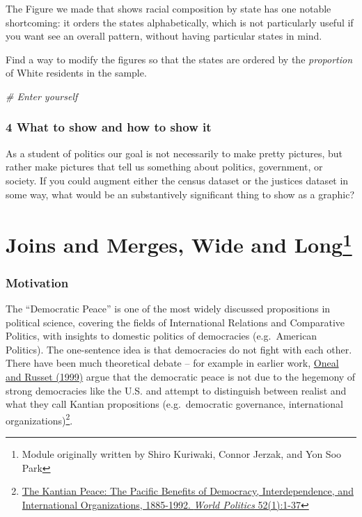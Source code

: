 \documentclass[
]{book}
\newenvironment{Shaded}{\begin{snugshade}}{\end{snugshade}}
\newcommand{\CommentTok}[1]{\textcolor[rgb]{0.56,0.35,0.01}{\textit{#1}}}
\theoremstyle{definition}
\theoremstyle{definition}
\theoremstyle{definition}
\theoremstyle{remark}
\begin{document}
The Figure we made that shows racial composition by state has one notable shortcoming: it orders the states alphabetically, which is not particularly useful if you want see an overall pattern, without having particular states in mind.

Find a way to modify the figures so that the states are ordered by the \emph{proportion} of White residents in the sample.

\begin{Shaded}
\begin{Highlighting}[]
\CommentTok{\# Enter yourself}
\end{Highlighting}
\end{Shaded}

\hypertarget{what-to-show-and-how-to-show-it}{%
\subsection*{4 What to show and how to show it}\label{what-to-show-and-how-to-show-it}}

As a student of politics our goal is not necessarily to make pretty pictures, but rather make pictures that tell us something about politics, government, or society. If you could augment either the census dataset or the justices dataset in some way, what would be an substantively significant thing to show as a graphic?

\hypertarget{dempeace}{%
\chapter[Joins and Merges, Wide and Long]{\texorpdfstring{Joins and Merges, Wide and Long\footnote{Module originally written by Shiro Kuriwaki, Connor Jerzak, and Yon Soo Park}}{Joins and Merges, Wide and Long}}\label{dempeace}}

\hypertarget{motivation-1}{%
\subsection*{Motivation}\label{motivation-1}}

The ``Democratic Peace'' is one of the most widely discussed propositions in political science, covering the fields of International Relations and Comparative Politics, with insights to domestic politics of democracies (e.g.~American Politics). The one-sentence idea is that democracies do not fight with each other. There have been much theoretical debate -- for example in earlier work, \href{https://blackboard.angelo.edu/bbcswebdav/institution/LFA/CSS/Course\%20Material/SEC6302/Readings/Lesson_3/Oneal-Russett.pdf}{Oneal and Russet (1999)} argue that the democratic peace is not due to the hegemony of strong democracies like the U.S. and attempt to distinguish between realist and what they call Kantian propositions (e.g.~democratic governance, international organizations)\footnote{\href{https://blackboard.angelo.edu/bbcswebdav/institution/LFA/CSS/Course\%20Material/SEC6302/Readings/Lesson_3/Oneal-Russett.pdf}{The Kantian Peace: The Pacific Benefits of Democracy, Interdependence, and International Organizations, 1885-1992. \emph{World Politics} 52(1):1-37}}.
\end{document}

